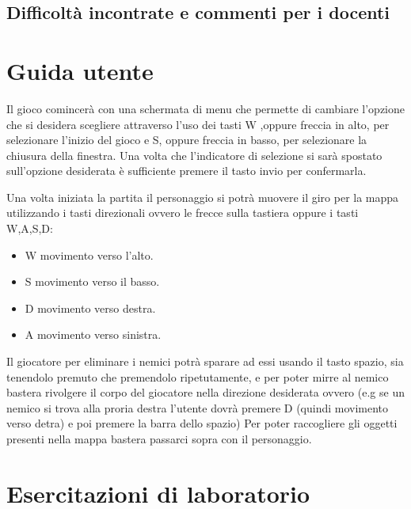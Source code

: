 \documentclass[a4paper,12pt]{report}
\begin{document}
    \section{Difficoltà incontrate e commenti per i docenti}
    \appendix
    \chapter{Guida utente}
    \par Il gioco comincerà con una schermata di menu che permette di cambiare l'opzione che si desidera scegliere attraverso l'uso
     dei tasti W ,oppure freccia in alto, per selezionare l'inizio del gioco e S, oppure freccia in basso, per selezionare la chiusura della finestra.
     Una volta che l'indicatore di selezione si sarà spostato sull'opzione desiderata è sufficiente premere il tasto invio per confermarla.
     \par Una volta iniziata la partita il personaggio si potrà muovere il giro per la mappa utilizzando i tasti direzionali ovvero le
      frecce sulla tastiera oppure i tasti W,A,S,D:
     \begin{itemize}
             \item W movimento verso l'alto.
             \item S movimento verso il basso.
             \item D movimento verso destra.
             \item A movimento verso sinistra.
     \end{itemize}
     Il giocatore per eliminare i nemici potrà sparare ad essi usando il tasto spazio, sia tenendolo premuto che premendolo ripetutamente,
     e per poter mirre al nemico bastera rivolgere il corpo del giocatore nella direzione desiderata ovvero (e.g se un nemico si trova alla
     proria destra l'utente dovrà premere D (quindi movimento verso detra) e poi premere la barra dello spazio)
     Per poter raccogliere gli oggetti presenti nella mappa bastera passarci sopra con il personaggio.
    \chapter{Esercitazioni di laboratorio}
    \printbibliography[heading=bibintoc]
\end{document}
